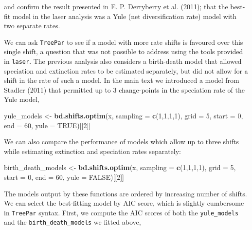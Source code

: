 \documentclass[author-year, review, 12pt]{elsarticle} %
\newenvironment{Shaded}{}{}
\newcommand{\KeywordTok}[1]{\textcolor[rgb]{0.00,0.44,0.13}{\textbf{{#1}}}}
\newcommand{\DataTypeTok}[1]{\textcolor[rgb]{0.56,0.13,0.00}{{#1}}}
\newcommand{\DecValTok}[1]{\textcolor[rgb]{0.25,0.63,0.44}{{#1}}}
\newcommand{\OtherTok}[1]{\textcolor[rgb]{0.00,0.44,0.13}{{#1}}}
\newcommand{\NormalTok}[1]{{#1}}
\begin{document}
\begin{Shaded}
\end{Shaded}
and confirm the result presented in E. P. Derryberry et al. (2011); that
the best-fit model in the laser analysis was a Yule (net diversification
rate) model with two separate rates.

We can ask \texttt{TreePar} to see if a model with more rate shifts is
favoured over this single shift, a question that was not possible to
address using the tools provided in \texttt{laser}. The previous
analysis also considers a birth-death model that allowed speciation and
extinction rates to be estimated separately, but did not allow for a
shift in the rate of such a model. In the main text we introduced a
model from Stadler (2011) that permitted up to 3 change-points in the
speciation rate of the Yule model,

\begin{Shaded}
\begin{Highlighting}[]
\NormalTok{yule_models <- }\KeywordTok{bd.shifts.optim}\NormalTok{(x, }\DataTypeTok{sampling =} \KeywordTok{c}\NormalTok{(}\DecValTok{1}\NormalTok{,}\DecValTok{1}\NormalTok{,}\DecValTok{1}\NormalTok{,}\DecValTok{1}\NormalTok{), }
  \DataTypeTok{grid =} \DecValTok{5}\NormalTok{, }\DataTypeTok{start =} \DecValTok{0}\NormalTok{, }\DataTypeTok{end =} \DecValTok{60}\NormalTok{, }\DataTypeTok{yule =} \OtherTok{TRUE}\NormalTok{)[[}\DecValTok{2}\NormalTok{]]}
\end{Highlighting}
\end{Shaded}
We can also compare the performance of models which allow up to three
shifts while estimating extinction and speciation rates separately:

\begin{Shaded}
\begin{Highlighting}[]
\NormalTok{birth_death_models <- }\KeywordTok{bd.shifts.optim}\NormalTok{(x, }\DataTypeTok{sampling =} \KeywordTok{c}\NormalTok{(}\DecValTok{1}\NormalTok{,}\DecValTok{1}\NormalTok{,}\DecValTok{1}\NormalTok{,}\DecValTok{1}\NormalTok{), }
  \DataTypeTok{grid =} \DecValTok{5}\NormalTok{, }\DataTypeTok{start =} \DecValTok{0}\NormalTok{, }\DataTypeTok{end =} \DecValTok{60}\NormalTok{, }\DataTypeTok{yule =} \OtherTok{FALSE}\NormalTok{)[[}\DecValTok{2}\NormalTok{]]}
\end{Highlighting}
\end{Shaded}
The models output by these functions are ordered by increasing number of
shifts. We can select the best-fitting model by AIC score, which is
slightly cumbersome in \texttt{TreePar} syntax. First, we compute the
AIC scores of both the \texttt{yule\_models} and the
\texttt{birth\_death\_models} we fitted above,
\end{document}

